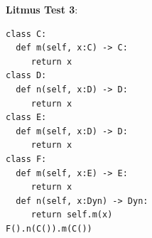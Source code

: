 \documentclass[acmsmall, anonymous, authordraft, review]{acmart} %
\begin{document}
\noindent\textbf{Litmus Test 3}:
\begin{verbatim}
class C:
  def m(self, x:C) -> C:
     return x
class D:
  def n(self, x:D) -> D:
     return x
class E:
  def m(self, x:D) -> D:
     return x
class F:
  def m(self, x:E) -> E:
     return x   
  def n(self, x:Dyn) -> Dyn:
     return self.m(x)
F().n(C()).m(C())
\end{verbatim}
\end{document}
